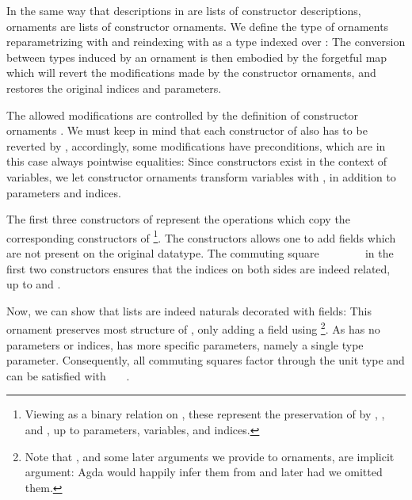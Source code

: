In the same way that descriptions in  are lists of constructor descriptions, ornaments are lists of constructor ornaments. We define the type of ornaments reparametrizing with  and reindexing with  as a type indexed over :
The conversion between types induced by an ornament is then embodied by the forgetful map
which will revert the modifications made by the constructor ornaments, and restores the original indices and parameters.

The allowed modifications are controlled by the definition of constructor ornaments . We must keep in mind that each constructor of  also has to be reverted by , accordingly, some modifications have preconditions, which are in this case always pointwise equalities:
Since constructors exist in the context of variables, we let constructor ornaments transform variables with , in addition to parameters and indices.

The first three constructors of  represent the operations which copy the corresponding constructors of \footnote{Viewing  as a binary relation on , these represent the preservation of  by , , and , up to parameters, variables, and indices.}. The  constructors allows one to add fields which are not present on the original datatype.
The commuting square \ \ \ \ \ \ \  in the first two constructors ensures that the indices on both sides are indeed related, up to  and .

Now, we can show that lists are indeed naturals decorated with fields:
This ornament preserves most structure of \bN{}, only adding a field using \footnote{Note that , and some later arguments we provide to ornaments, are implicit argument: Agda would happily infer them from  and later  had we omitted them.}. As \bN{} has no parameters or indices,  has more specific parameters, namely a single type parameter. Consequently, all commuting squares factor through the unit type and can be satisfied with \ \AV{\_}\ \ . 

